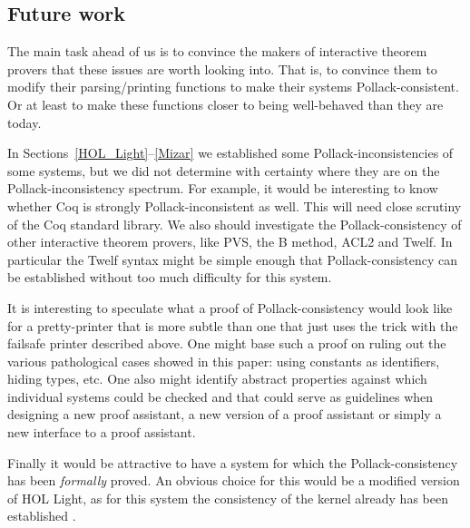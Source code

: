 \documentclass{entcs}
\begin{document}
\subsection{Future work}

The main task ahead of us is to convince the makers of interactive
theorem provers that these issues are worth looking into.
That is, to convince them to modify their parsing/printing functions to make their
systems Pollack-consistent.
Or at least to make these functions closer to being well-behaved than they
are today.

In Sections~\ref{HOL_Light}--\ref{Mizar} we established some
Pollack-inconsistencies of some systems, but we
did not determine with certainty
where they are on the Pollack-inconsis\-tency spectrum.
For example, it would be interesting to know
whether Coq
is strongly Pollack-inconsistent as well.
This will need close scrutiny of the Coq standard library.
We also should investigate the Pollack-consistency of
other interactive theorem provers, like {\small PVS}, the B method, {\small ACL}2 and Twelf.
In particular the Twelf syntax might be simple enough that
Pollack-consistency can be established without too much difficulty for this system.

It is interesting to speculate what a proof of
Pollack-consistency would look
like for a pretty-printer that is more subtle than one that
just uses the trick with
the failsafe printer described above.
One might base such a proof on ruling out the various pathological
cases showed in this paper: using constants as identifiers, hiding types, etc.
One also might identify abstract properties against
which individual systems could be checked and that could serve as guidelines when designing a new proof
assistant, a new version of a proof assistant or simply a new interface to a proof assistant.

Finally it would be attractive to have a system for which the Pollack-consis\-ten\-cy
has been \emph{formally} proved.
An obvious choice for this would be a modified version of {\small HOL} Light,
as for this system the consistency of the kernel already has been established \cite{har:06}.


%
%
\end{document}
